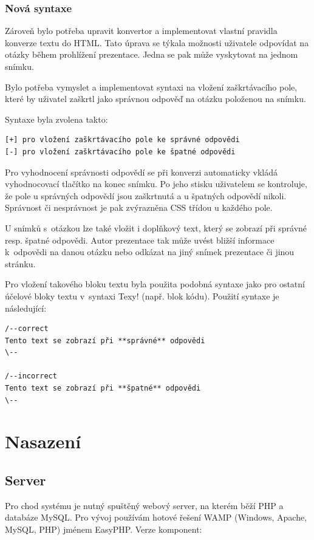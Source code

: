 \documentclass[11pt,twoside,a4paper]{book}
\begin{document}
\subsection{Nová syntaxe}
Zároveň bylo potřeba upravit konvertor a implementovat vlastní pravidla konverze textu do HTML. Tato úprava se týkala
možnosti uživatele odpovídat na otázky během prohlížení prezentace. Jedna se pak může vyskytovat na jednom snímku.

Bylo potřeba vymyslet a implementovat syntaxi na vložení zaškrtávacího pole, které by uživatel zaškrtl jako správnou
odpověď na otázku položenou na snímku.

Syntaxe byla zvolena takto:

\begin{lstlisting}[caption=Syntaxe odpovědí]
[+] pro vložení zaškrtávacího pole ke správné odpovědi
[-] pro vložení zaškrtávacího pole ke špatné odpovědi
\end{lstlisting}

Pro vyhodnocení správnosti odpovědí se při konverzi automaticky vkládá vyhodnocovací tlačítko na konec snímku. Po jeho
stisku uživatelem se kontroluje, že pole u správných odpovědí jsou zaškrtnutá a u špatných odpovědí nikoli. Správnost
či nesprávnost je pak zvýrazněna CSS třídou u každého pole.

U snímků s~otázkou lze také vložit i doplňkový text, který se zobrazí při správné resp. špatné odpovědi. Autor
prezentace tak může uvést bližší informace k~odpovědi na danou otázku nebo odkázat na jiný snímek prezentace či jinou
stránku.

Pro vložení takového bloku textu byla použita podobná syntaxe jako pro ostatní účelové bloky textu v~syntaxi Texy!
(např. blok kódu). Použití syntaxe je následující:

\begin{lstlisting}[caption=Syntaxe doplňkových textů]
/--correct
Tento text se zobrazí při **správné** odpovědi
\--

/--incorrect
Tento text se zobrazí při **špatné** odpovědi
\--
\end{lstlisting}



\chapter{Nasazení}

\section{Server}
Pro chod systému je nutný spuštěný webový server, na kterém běží PHP a databáze MySQL. Pro vývoj používám hotové řešení WAMP (Windows, Apache, MySQL, PHP) jménem EasyPHP. Verze komponent:
\end{document}
